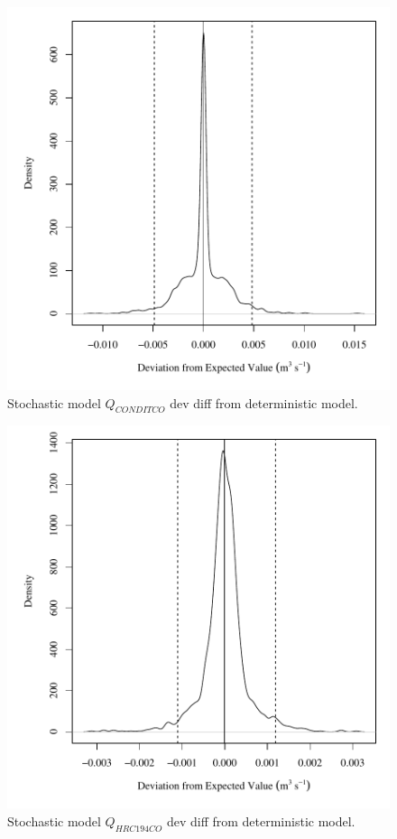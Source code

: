 \begin{center}
\begin{figure}[htbp]
	\includegraphics[width=6in]{"Figures/Results_USR/V dev diff qCON"}
	\caption{Stochastic model $Q_{CONDITCO}$ dev diff from deterministic model.}
\end{figure}
\end{center}
\newpage

\begin{center}
\begin{figure}[htbp]
	\includegraphics[width=6in]{"Figures/Results_USR/V dev diff qHRC"}
	\caption{Stochastic model $Q_{HRC194CO}$ dev diff from deterministic model.}
\end{figure}
\end{center}
\newpage

